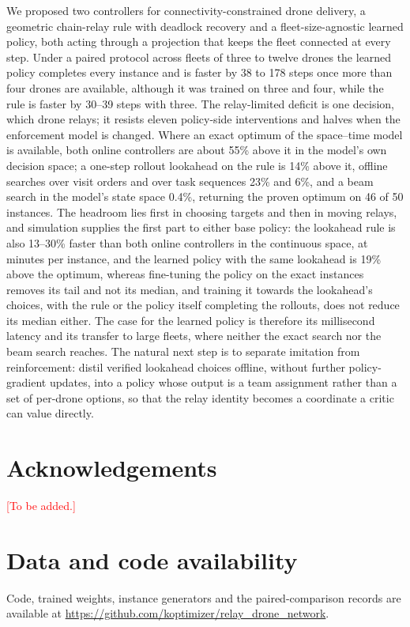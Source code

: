 \documentclass[final,5p,times,twocolumn]{elsarticle}
\newcommand{\pending}[1]{\textcolor{red}{[#1]}}
\begin{document}
We proposed two controllers for connectivity-constrained drone delivery, a geometric chain-relay
rule with deadlock recovery and a fleet-size-agnostic learned policy, both acting through a
projection that keeps the fleet connected at every step. Under a paired protocol across fleets of
three to twelve drones the learned policy completes every instance and is faster by 38 to 178
steps once more than four drones are available, although it was trained on three and four, while the rule is faster by 30--39 steps with
three. The relay-limited deficit is one decision, which drone relays; it resists eleven policy-side
interventions and halves when the enforcement model is changed. Where an exact optimum of the space--time model is available, both online controllers are about 55\%
above it in the model's own decision space; a one-step rollout lookahead on the rule is 14\%
above it, offline searches over visit orders and over task sequences 23\% and 6\%, and a beam
search in the model's state space 0.4\%, returning the proven optimum on 46 of 50 instances.
The headroom lies first in choosing targets and then in moving relays, and simulation supplies
the first part to either base policy: the lookahead rule is also 13--30\% faster than both
online controllers in the continuous space, at minutes per instance, and the learned policy with
the same lookahead is 19\% above the optimum, whereas fine-tuning the policy on the exact
instances removes its tail and not its median, and training it towards the lookahead's choices,
with the rule or the policy itself completing the rollouts, does not reduce its median either.
The case for the learned policy is therefore its millisecond latency and its transfer to large
fleets, where neither the exact search nor the beam search reaches. The natural next step is to
separate imitation from reinforcement: distil verified lookahead choices offline, without
further policy-gradient updates, into a policy whose output is a team assignment rather than a set
of per-drone options, so that the relay identity becomes a coordinate a critic can value directly.

\section*{Acknowledgements}
\pending{To be added.}

\section*{Data and code availability}
Code, trained weights, instance generators and the paired-comparison records are available at
\url{https://github.com/koptimizer/relay_drone_network}.



\end{document}
